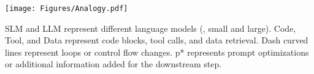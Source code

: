 {
\begin{figure*}[t]   %
\begin{center}
\centerline{\texttt{[image: Figures/Analogy.pdf]}}
{
SLM and LLM represent different language models (\eg, small and large). Code, Tool, and Data represent code blocks, tool calls, and data retrieval. Dash curved lines represent loops or control flow changes. p* represents prompt optimizations or additional information added for the downstream step.
}
\label{fig-analogy}
\end{center}
\end{figure*}
}